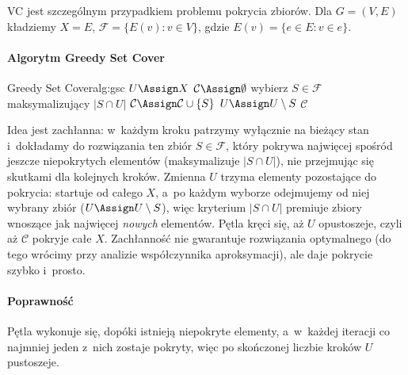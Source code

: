 \begin{remark}
	VC jest szczególnym przypadkiem problemu pokrycia zbiorów. Dla $G = (V, E)$ kładziemy $X = E$, $\mathcal{F} = \{E(v) : v \in V\}$, gdzie $E(v) = \{e \in E : v \in e\}$.
\end{remark}

\paragraph{Algorytm Greedy Set Cover}

\begin{alg}{Greedy Set Cover}{alg:gsc}
	\State $U \Assign X$ 
	\State $\mathcal{C} \Assign \emptyset$ 
	\State wybierz $S \in \mathcal{F}$ maksymalizujący $|S \cap U|$ \label{line:gsc-greedy}
	\State $\mathcal{C} \Assign \mathcal{C} \cup \{S\}$
	\State $U \Assign U \setminus S$
	\EndWhile
	\State \Return $\mathcal{C}$
	\EndFunction
\end{alg}

\begin{dygresja}
	Idea jest zachłanna: w~każdym kroku patrzymy wyłącznie na bieżący stan i~dokładamy do rozwiązania ten zbiór $S \in \mathcal{F}$, który pokrywa najwięcej spośród jeszcze niepokrytych elementów (maksymalizuje $|S \cap U|$), nie przejmując się skutkami dla kolejnych kroków. Zmienna $U$ trzyma elementy pozostające do pokrycia: startuje od całego $X$, a~po każdym wyborze odejmujemy od niej wybrany zbiór ($U \Assign U \setminus S$), więc kryterium $|S \cap U|$ premiuje zbiory wnoszące jak najwięcej \emph{nowych} elementów. Pętla kręci się, aż $U$ opustoszeje, czyli aż $\mathcal{C}$ pokryje całe $X$. Zachłanność nie gwarantuje rozwiązania optymalnego (do tego wrócimy przy analizie współczynnika aproksymacji), ale daje pokrycie szybko i~prosto.
\end{dygresja}

\paragraph{Poprawność}
Pętla wykonuje się, dopóki istnieją niepokryte elementy, a~w~każdej iteracji co najmniej jeden z~nich zostaje pokryty, więc po skończonej liczbie kroków $U$ pustoszeje.

